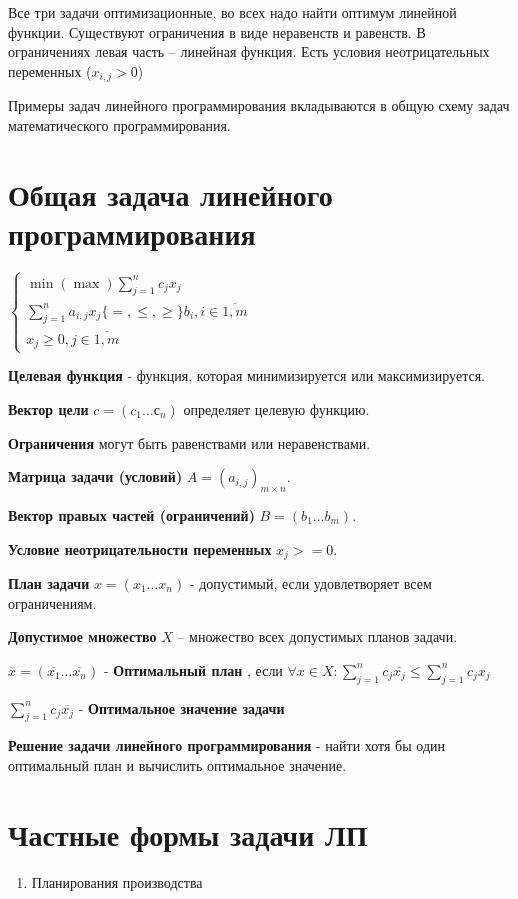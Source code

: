 \documentclass[11pt]{article}
\begin{document}
\begin{sloppypar}
  Все три задачи оптимизационные, во всех надо найти оптимум линейной функции. Существуют ограничения в виде неравенств и равенств. В ограничениях левая часть – линейная функция. Есть условия неотрицательных переменных ($x_{i, j} > 0$)
  
  Примеры задач линейного программирования вкладываются в общую схему задач математического программирования.
  
  \section*{Общая задача линейного программирования}
  $\begin{cases}
    \min(\max) \sum_{j = 1}^n c_j x_j \\
    \sum_{j = 1}^n a_{i, j} x_j \{=, \leq, \geq\} b_i, i \in \overline{1, m} \\
    x_j \geq 0, j \in \overline{1, m}
  \end{cases}$
  
  \textbf{Целевая функция} - функция, которая минимизируется или максимизируется.
  
  \textbf{Вектор цели} $c = (c_1 \dots с_n)$ определяет целевую функцию.
  
  \textbf{Ограничения} могут быть равенствами или неравенствами.
  
  
  \textbf{Матрица задачи (условий)} $A = (a_{i, j})_{m \times n}$.
  	
  \textbf{Вектор правых частей (ограничений)} $B = (b_1 \dots b_m)$.
  
  \textbf{Условие неотрицательности переменных} $x_j >= 0$.

  \textbf{План задачи} $x = (x_1 \dots x_n)$ - допустимый, если удовлетворяет всем ограничениям.
  
  \textbf{Допустимое множество} $X$ – множество всех допустимых планов задачи.

  $\overline{x} = (\overline{x_1} \dots \overline{x_n})$ - \textbf{Оптимальный план} , если $\forall x \in X: \sum_{j = 1}^n c_j \overline{x_j} \leq \sum_{j = 1}^n c_j x_j$

$\sum_{j = 1}^n c_j \overline{x_j}$ - \textbf{Оптимальное значение задачи}

\textbf{Решение задачи линейного программирования} - найти хотя бы один оптимальный план и вычислить оптимальное значение.

\section*{Частные формы задачи ЛП}
\begin{enumerate}
  \item Планирования производства
  

\end{enumerate}
\end{sloppypar}
\end{document}
